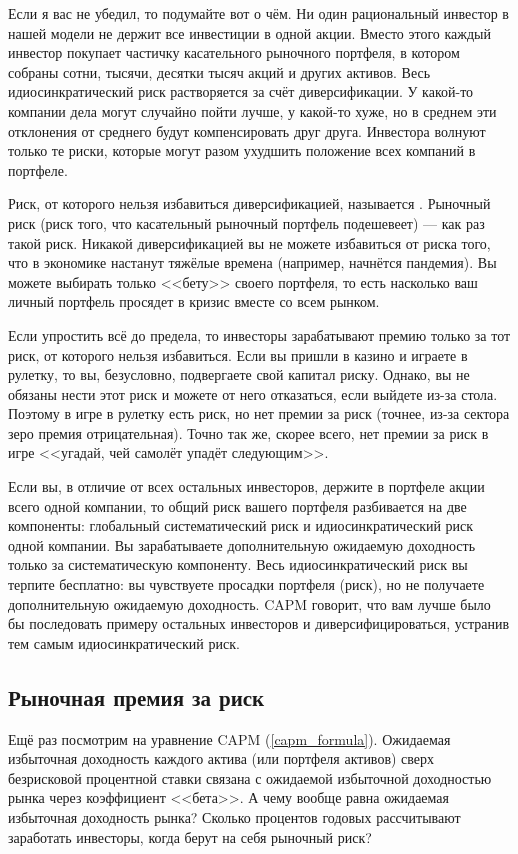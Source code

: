 Если я вас не убедил, то подумайте вот о чём. Ни один рациональный инвестор в 
нашей модели не держит все инвестиции в одной акции. Вместо этого каждый 
инвестор покупает частичку касательного рыночного портфеля, в котором собраны 
сотни, тысячи, десятки тысяч акций и других активов. Весь идиосинкратический 
риск растворяется за счёт диверсификации. У какой-то компании дела могут 
случайно пойти лучше, у какой-то хуже, но в среднем эти отклонения от среднего 
будут компенсировать друг друга. Инвестора волнуют только те риски, которые 
могут разом ухудшить положение всех компаний в портфеле.

Риск, от которого нельзя избавиться диверсификацией, называется 
. Рыночный риск (риск того, что касательный 
рыночный портфель подешевеет) --- как раз такой риск. Никакой диверсификацией вы 
не можете избавиться от риска того, что в экономике настанут тяжёлые времена 
(например, начнётся пандемия). Вы можете выбирать только <<бету>> своего 
портфеля, то есть насколько ваш личный портфель просядет в кризис вместе со всем 
рынком.

Если упростить всё до предела, то инвесторы зарабатывают премию только за тот 
риск, от которого нельзя избавиться. Если вы пришли в казино и играете в 
рулетку, то вы, безусловно, подвергаете свой капитал риску. Однако, вы не 
обязаны нести этот риск и можете от него отказаться, если выйдете из-за стола. 
Поэтому в игре в рулетку есть риск, но нет премии за риск (точнее, из-за сектора 
зеро премия отрицательная). Точно так же, скорее всего, нет премии за риск в 
игре <<угадай, чей самолёт упадёт следующим>>.

Если вы, в отличие от всех остальных инвесторов, держите в портфеле акции всего 
одной компании, то общий риск вашего портфеля разбивается на две компоненты:
глобальный систематический риск и идиосинкратический риск одной компании. Вы 
зарабатываете дополнительную ожидаемую доходность только за систематическую 
компоненту. Весь идиосинкратический риск вы терпите бесплатно: вы чувствуете 
просадки портфеля (риск), но не получаете дополнительную ожидаемую доходность. 
CAPM говорит, что вам лучше было бы последовать примеру остальных инвесторов и 
диверсифицироваться, устранив тем самым идиосинкратический риск.

\subsection{Рыночная премия за риск}

Ещё раз посмотрим на уравнение CAPM (\ref{capm_formula}). Ожидаемая избыточная 
доходность каждого актива (или портфеля активов) сверх безрисковой процентной 
ставки связана с ожидаемой избыточной доходностью рынка через коэффициент 
<<бета>>. А чему вообще равна ожидаемая избыточная доходность рынка? Сколько 
процентов годовых рассчитывают заработать инвесторы, когда берут на себя 
рыночный риск?

